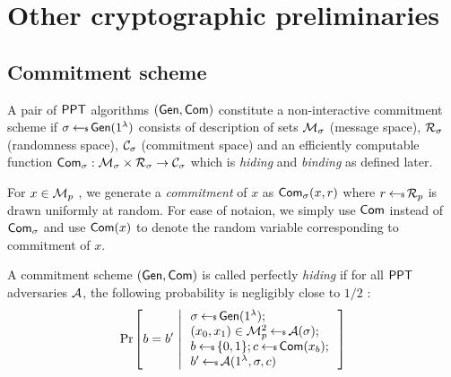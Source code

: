 \section{Other cryptographic preliminaries}
\subsection{Commitment scheme} \label{app:DefCommitment}
\begin{definition}\label{defn:commscheme}
 A pair of $\mathsf{PPT}$ algorithms $(\mathsf{Gen},\mathsf{Com})$ constitute a non-interactive commitment scheme if $\sigma\hskip2.3pt{\gets\!\!\mbox{\tiny${\$}$\normalsize}}\, \mathsf{Gen}(1^{\lambda})$ consists of description of sets $\mathcal{M}_\sigma$ (message space), $\mathcal{R}_\sigma$ (randomness space), $\mathcal{C}_\sigma$ (commitment space) and an efficiently computable function $\mathsf{Com}_\sigma: \mathcal{M}_\sigma\times \mathcal{R}_\sigma\rightarrow \mathcal{C}_\sigma$ which is {\em hiding} and {\em binding} as defined later.
\end{definition}

For $x\in \mathcal{M}_p$ , we generate a {\em commitment} of $x$ as $\mathsf{Com}_\sigma(x,r)$ where $r\hskip2.3pt{\gets\!\!\mbox{\tiny${\$}$\normalsize}}\, \mathcal{R}_p$  is drawn uniformly at random. For ease of notaion, we simply use $\mathsf{Com}$ instead of $\mathsf{Com}_\sigma$ and use $\mathsf{Com}(x)$ to denote the random variable corresponding to commitment of $x$. 

\begin{definition}\label{defn:hidingcomm}
A commitment scheme $(\mathsf{Gen},\mathsf{Com})$ is called perfectly {\em hiding}  if for all $\mathsf{PPT}$  adversaries $\mathcal{A}$, the following probability is negligibly close to $1/2$ :
\begin{align*}
\condprob{b=b'}{
\begin{array}{l}
\sigma\sample \gen(\secparam); \\
(x_0,x_1)\in \calM^2_p\sample \adv(\sigma); \\
b\sample \bitset; c\sample \com(x_b);\\
b'\sample \adv(\secparam,\sigma,c)
\end{array}
}
\end{align*}
\end{definition}


